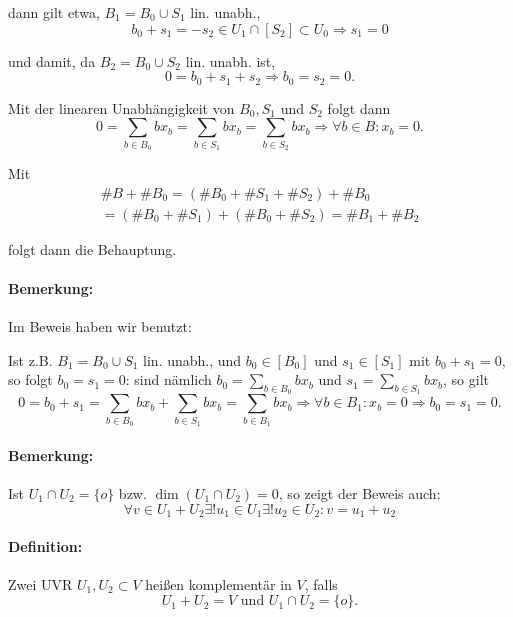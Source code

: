 	dann gilt etwa, $ B_1 = B_0 \cup S_1 $ lin. unabh.,
		\begin{equation*}
		b_0+s_1 = -s_2 \in U_1\cap [S_2]\subset U_0 \Rightarrow s_1 = 0
		\end{equation*}
		
	und damit, da $ B_2 = B_0 \cup S_2 $ lin. unabh. ist,
		\begin{equation*}
		0 = b_0 + s_1 + s_2 \Rightarrow b_0=s_2 = 0.
		\end{equation*}
	
	Mit der linearen Unabhängigkeit von $ B_0, S_1 $ und $ S_2 $ folgt dann
		\begin{equation*}
		0 = \sum_{b\in B_0}bx_b = \sum_{b\in S_1}bx_b = \sum_{b\in S_2}bx_b \Rightarrow \forall b\in B: x_b = 0.
		\end{equation*}
	
	Mit
		\begin{gather*}
		\#B + \#B_0 = (\#B_0 + \#S_1 + \#S_2) + \#B_0\\
		= (\#B_0+\#S_1)+(\#B_0 + \#S_2) = \#B_1+\#B_2
		\end{gather*}
	
	folgt dann die Behauptung.

\paragraph{Bemerkung: }
	Im Beweis haben wir benutzt: 
	
	Ist z.B. $ B_1 = B_0\cup S_1 $ lin. unabh., und $ b_0\in [B_0] $ und $ s_1\in [S_1] $ mit $ b_0 + s_1 = 0 $, so folgt $ b_0 = s_1 = 0 $:
	sind nämlich $ b_0 = \sum_{b\in B_0} bx_b $ und $ s_1 = \sum_{b\in S_1}bx_b $, so gilt 
		\begin{equation*}
		0 = b_0+s_1 = \sum_{b\in B_0} bx_b+\sum_{b\in S_1} bx_b = \sum_{b\in B_1} bx_b \Rightarrow \forall b\in B_1: x_b = 0\Rightarrow b_0 = s_1 = 0.
		\end{equation*}

\paragraph{Bemerkung: }
	Ist $ U_1\cap U_2 = \{o\} $ bzw. $ \dim (U_1\cap U_2)  = 0 $, so zeigt der Beweis auch:
		\begin{equation*}
		\forall v\in U_1+U_2\exists ! u_1 \in U_1\exists ! u_2\in U_2: v= u_1+u_2
		\end{equation*}

\paragraph{Definition: }
	Zwei UVR $ U_1,U_2 \subset V $ heißen komplementär in $ V $, falls
		\begin{equation*}
		U_1+U_2=V\text{ und } U_1\cap U_2 = \{o\}.
		\end{equation*}
		
